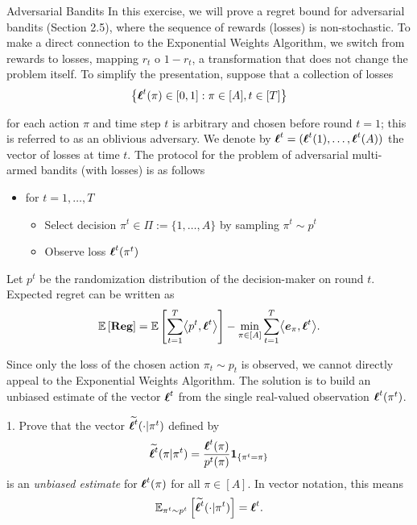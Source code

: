 
\begin{exercise}[]{Adversarial Bandits}
    In this exercise, we will prove a regret bound for adversarial bandits
     (Section 2.5), where the sequence of rewards (losses) is non-stochastic.
      To make a direct connection to the Exponential Weights Algorithm, we switch from rewards to losses,       
       mapping $r_t$ o $1-r_t$, a transformation that does not change the problem itself. 
       To simplify the presentation, suppose that a collection of losses
       \[\left \{ \bsl^t(\pi) \in [0,1] : \pi \in [A], t \in [T]\right \} \]


       for each action $\pi$ and time step $t$ is arbitrary and chosen before round $t = 1$;
        this is referred to as an oblivious adversary. We denote by $\bsl^t = (\bsl^t (1), \ldots , \bsl^t(A))$
         the vector of losses at time $t$. The protocol for the problem of adversarial multi-armed bandits (with losses) is as follows
         \begin{itemize}
            \item for $t=1,\ldots,T$ 
            \begin{itemize}
                \item Select decision $\pi^t\in \Pi:=\{1,\ldots,A\}$ by sampling $\pi^t \sim p^t$
                \item Observe loss $\bsl^t(\pi^t)$
            \end{itemize}
         \end{itemize}

         Let $p^t$ be the randomization distribution of the decision-maker on round $t$. 
         Expected regret can be written as
         \[ \EE{\Reg} = \EE{\sum_{t=1}^T \biprod{p^t}{\bsl^t}} - \min_{\pi \in [A]}\sum_{t=1}^T \biprod{\boldsymbol{e}_\pi}{\bsl^t}.\]

Since only the loss of the chosen action $\pi_t \sim p_t$ is observed, we cannot directly appeal to the Exponential Weights Algorithm. 
The solution is to build an unbiased estimate of the vector $ \bsl^t $ from the single real-valued observation $\bsl^t(\pi^t)$.

1. Prove that the vector $\wt {\bsl^t} (\cdot| \pi^t)$ defined by
\[ \wt{\bsl^t}(\pi | \pi^t) = \frac{\bsl^t(\pi)}{p^t(\pi)} \mathbf{1}_{\{\pi^t=\pi\}}\]
is an \textit{unbiased estimate} for $\bsl^t(\pi)$ for all $\pi \in [A]$. In vector notation, this means 
\[ \EEs{\wt{\bsl^t}(\cdot|\pi^t)}{\pi^t \sim p^t}=\bsl^t.\]


\end{exercise}
